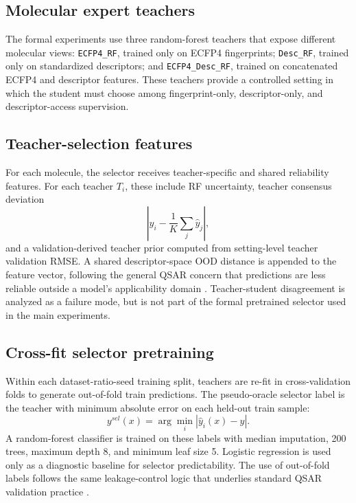\documentclass[11pt]{article}
\begin{document}
\subsection{Molecular expert teachers}

The formal experiments use three random-forest teachers that expose different
molecular views: \texttt{ECFP4\_RF}, trained only on ECFP4 fingerprints;
\texttt{Desc\_RF}, trained only on standardized descriptors; and
\texttt{ECFP4\_Desc\_RF}, trained on concatenated ECFP4 and descriptor
features. These teachers provide a controlled setting in which the student
must choose among fingerprint-only, descriptor-only, and descriptor-access
supervision.

\subsection{Teacher-selection features}

For each molecule, the selector receives teacher-specific and shared
reliability features. For each teacher \(T_i\), these include RF uncertainty,
teacher consensus deviation
\[
\left|\hat{y}_i-\frac{1}{K}\sum_j\hat{y}_j\right|,
\]
and a validation-derived teacher prior computed from setting-level teacher validation RMSE. A shared
descriptor-space OOD distance is appended to the feature vector, following the
general QSAR concern that predictions are less reliable outside a model's
applicability domain \cite{Netzeva2005AD,Tropsha2010QSAR}. Teacher-student
disagreement is analyzed as a failure mode, but is not part of the formal
pretrained selector used in the main experiments.

\subsection{Cross-fit selector pretraining}

Within each dataset-ratio-seed training split, teachers are re-fit in
cross-validation folds to generate out-of-fold train predictions. The
pseudo-oracle selector label is the teacher with minimum absolute error on each
held-out train sample:
\[
y^{sel}(x)=\arg\min_i |\hat{y}_i(x)-y|.
\]
A random-forest classifier is trained on these labels with median imputation,
200 trees, maximum depth 8, and minimum leaf size 5. Logistic regression is
used only as a diagnostic baseline for selector predictability. The use of
out-of-fold labels follows the same leakage-control logic that underlies
standard QSAR validation practice \cite{Tropsha2010QSAR}.
\end{document}
